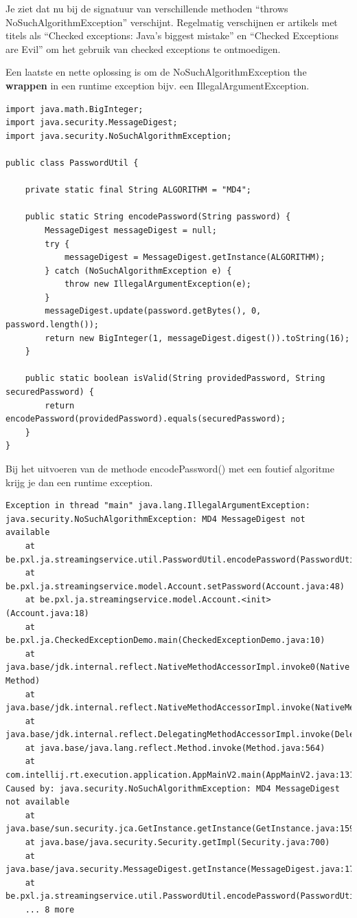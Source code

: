 Je ziet dat nu bij de signatuur van verschillende methoden ``throws NoSuchAlgorithmException'' verschijnt.
Regelmatig verschijnen er artikels met titels als ``Checked exceptions: Java’s biggest mistake'' en ``Checked Exceptions are Evil'' om het gebruik van checked exceptions te ontmoedigen. 

Een laatste en nette oplossing is om de NoSuchAlgorithmException the \textbf{wrappen}  in een runtime exception bijv. een IllegalArgumentException.

\begin{lstlisting}
import java.math.BigInteger;
import java.security.MessageDigest;
import java.security.NoSuchAlgorithmException;

public class PasswordUtil {

	private static final String ALGORITHM = "MD4";

	public static String encodePassword(String password) {
		MessageDigest messageDigest = null;
		try {
			messageDigest = MessageDigest.getInstance(ALGORITHM);
		} catch (NoSuchAlgorithmException e) {
			throw new IllegalArgumentException(e);
		}
		messageDigest.update(password.getBytes(), 0, password.length());
		return new BigInteger(1, messageDigest.digest()).toString(16);
	}

	public static boolean isValid(String providedPassword, String securedPassword) {
		return encodePassword(providedPassword).equals(securedPassword);
	}
}
\end{lstlisting}

Bij het uitvoeren van de methode encodePassword() met een foutief algoritme krijg je dan een runtime exception.

\begin{verbatim}
Exception in thread "main" java.lang.IllegalArgumentException: java.security.NoSuchAlgorithmException: MD4 MessageDigest not available
	at be.pxl.ja.streamingservice.util.PasswordUtil.encodePassword(PasswordUtil.java:17)
	at be.pxl.ja.streamingservice.model.Account.setPassword(Account.java:48)
	at be.pxl.ja.streamingservice.model.Account.<init>(Account.java:18)
	at be.pxl.ja.CheckedExceptionDemo.main(CheckedExceptionDemo.java:10)
	at java.base/jdk.internal.reflect.NativeMethodAccessorImpl.invoke0(Native Method)
	at java.base/jdk.internal.reflect.NativeMethodAccessorImpl.invoke(NativeMethodAccessorImpl.java:62)
	at java.base/jdk.internal.reflect.DelegatingMethodAccessorImpl.invoke(DelegatingMethodAccessorImpl.java:43)
	at java.base/java.lang.reflect.Method.invoke(Method.java:564)
	at com.intellij.rt.execution.application.AppMainV2.main(AppMainV2.java:131)
Caused by: java.security.NoSuchAlgorithmException: MD4 MessageDigest not available
	at java.base/sun.security.jca.GetInstance.getInstance(GetInstance.java:159)
	at java.base/java.security.Security.getImpl(Security.java:700)
	at java.base/java.security.MessageDigest.getInstance(MessageDigest.java:177)
	at be.pxl.ja.streamingservice.util.PasswordUtil.encodePassword(PasswordUtil.java:15)
	... 8 more
\end{verbatim}

